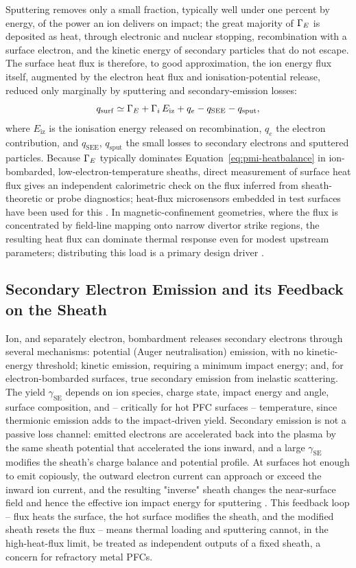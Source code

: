 Sputtering removes only a small fraction, typically well under one percent by energy, of the power an ion delivers on impact; the great majority of $\Gamma_{E}$ is deposited as heat, through electronic and nuclear stopping, recombination with a surface electron, and the kinetic energy of secondary particles that do not escape. The surface heat flux is therefore, to good approximation, the ion energy flux itself, augmented by the electron heat flux and ionisation-potential release, reduced only marginally by sputtering and secondary-emission losses:
\begin{equation}
q_{\mathrm{surf}} \simeq \Gamma_{E} + \Gamma_i\, E_{\mathrm{iz}} + q_{e} - q_{\mathrm{SEE}} - q_{\mathrm{sput}},
\label{eq:pmi-heatbalance}
\end{equation}
where $E_{\mathrm{iz}}$ is the ionisation energy released on recombination, $q_e$ the electron contribution, and $q_{\mathrm{SEE}}$, $q_{\mathrm{sput}}$ the small losses to secondary electrons and sputtered particles. Because $\Gamma_{E}$ typically dominates Equation~\eqref{eq:pmi-heatbalance} in ion-bombarded, low-electron-temperature sheaths, direct measurement of surface heat flux gives an independent calorimetric check on the flux inferred from sheath-theoretic or probe diagnostics; heat-flux microsensors embedded in test surfaces have been used for this \cite{ref0175}. In magnetic-confinement geometries, where the flux is concentrated by field-line mapping onto narrow divertor strike regions, the resulting heat flux can dominate thermal response even for modest upstream parameters; distributing this load is a primary design driver \cite{ref0581}.

\subsection{Secondary Electron Emission and its Feedback on the Sheath}

Ion, and separately electron, bombardment releases secondary electrons through several mechanisms: potential (Auger neutralisation) emission, with no kinetic-energy threshold; kinetic emission, requiring a minimum impact energy; and, for electron-bombarded surfaces, true secondary emission from inelastic scattering. The yield $\gamma_{\mathrm{SE}}$ depends on ion species, charge state, impact energy and angle, surface composition, and -- critically for hot PFC surfaces -- temperature, since thermionic emission adds to the impact-driven yield. Secondary emission is not a passive loss channel: emitted electrons are accelerated back into the plasma by the same sheath potential that accelerated the ions inward, and a large $\gamma_{\mathrm{SE}}$ modifies the sheath's charge balance and potential profile. At surfaces hot enough to emit copiously, the outward electron current can approach or exceed the inward ion current, and the resulting "inverse" sheath changes the near-surface field and hence the effective ion impact energy for sputtering \cite{ref0038}. This feedback loop -- flux heats the surface, the hot surface modifies the sheath, and the modified sheath resets the flux -- means thermal loading and sputtering cannot, in the high-heat-flux limit, be treated as independent outputs of a fixed sheath, a concern for refractory metal PFCs.

